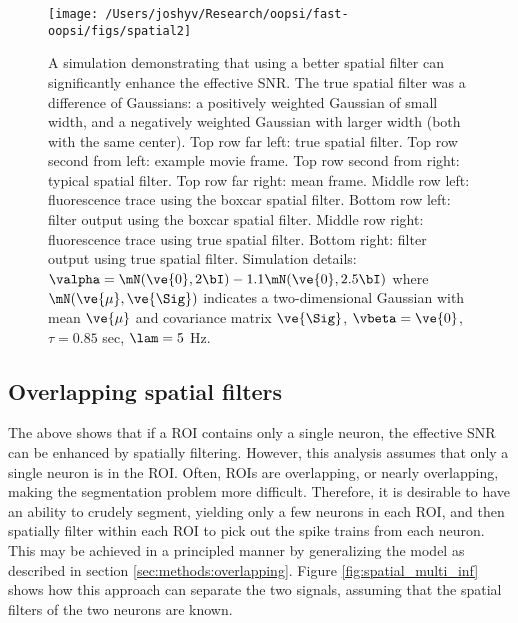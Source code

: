 \begin{figure}[h!]
\centering \texttt{[image: /Users/joshyv/Research/oopsi/fast-oopsi/figs/spatial2]}
\caption[spatial filtering can improve effective SNR]{A simulation demonstrating that using a better spatial filter can significantly enhance the effective SNR. The true spatial filter was a difference of Gaussians: a positively weighted Gaussian of small width, and a negatively weighted Gaussian with larger width (both with the same center).  Top row far left: true spatial filter.  Top row second from left: example movie frame. Top row second from right: typical spatial filter.   Top row far right: mean frame.  Middle row left: fluorescence trace using the boxcar spatial filter. Bottom row left: \foopsi filter output using the boxcar spatial filter.  Middle row right: fluorescence trace using true spatial filter.  Bottom right: \foopsi filter output using true spatial filter. Simulation details: $\valpha=\mN(\ve{0},2 \bI)-1.1 \mN(\ve{0},2.5 \bI)$ where $\mN(\ve{\mu},\ve{\Sig})$ indicates a two-dimensional Gaussian with mean $\ve{\mu}$ and covariance matrix $\ve{\Sig}$, $\vbeta=\ve{0}$, $\tau=0.85$ sec, $\lam=5$ Hz.} \label{fig:spatial} 
\end{figure}



\subsection{Overlapping spatial filters} \label{sec:results:overlapping}


The above shows that if a ROI contains only a single neuron, the effective SNR can be enhanced by spatially filtering.  However, this analysis assumes that only a single neuron is in the ROI.  Often, ROIs are overlapping, or nearly overlapping, making the segmentation problem more difficult.  Therefore, it is desirable to have an ability to crudely segment, yielding only a few neurons in each ROI, and then spatially filter within each ROI to pick out the spike trains from each neuron.  This may be achieved in a principled manner by generalizing the model as described in section \ref{sec:methods:overlapping}.  Figure \ref{fig:spatial_multi_inf} shows how this approach can separate the two signals, assuming that the spatial filters of the two neurons are known.  %


